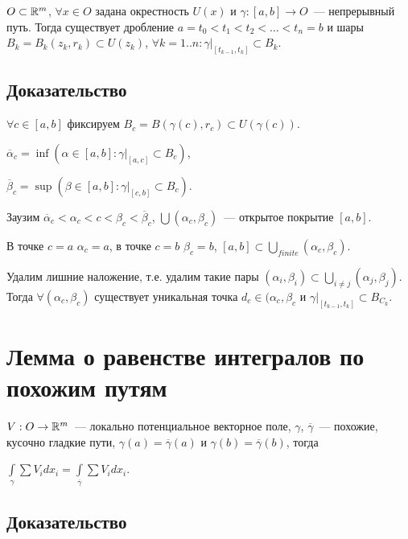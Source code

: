 \documentclass{article}
\begin{document}
        $O \subset \mathbb{R}^m$, $\forall x \in O$ задана окрестность $U(x)$ и $\gamma : [a, b] \rightarrow O$~--- непрерывный путь. Тогда существует дробление $a = t_0 < t_1 < t_2 < \ldots < t_n = b$ и шары $B_k = B_k(z_k, r_k) \subset U(z_k)$, $\forall k = 1..n : \gamma \big|_{[t_{k - 1}, t_k]} \subset B_k$.
        
        \subsection{Доказательство}
        
            $\forall c \in [a, b]$ фиксируем $B_c = B \left( \gamma(c), r_c \right) \subset U \left( \gamma (c) \right)$.
            
            $\overline{\alpha}_c = \inf \left( \alpha \in [a, b] : \gamma \bigg|_{[a, c]} \subset B_c \right)$,
            
            $\overline{\beta}_c = \sup \left( \beta \in [a, b] : \gamma \bigg|_{[c, b]} \subset B_c \right)$.
            
            Заузим $\overline{\alpha}_c < \alpha_c < c < \beta_c < \overline{\beta}_c$, $\bigcup ( \alpha_c, \beta_c )$~--- открытое покрытие $[a, b]$.
            
            В точке $c = a$ $\alpha_c = a$, в точке $c = b$ $\beta_c = b$, $[a, b] \subset \bigcup\limits_{finite} \left( \alpha_c, \beta_c \right)$. 
            
            Удалим лишние наложение, т.е. удалим такие пары $(\alpha_i, \beta_i) \subset \bigcup\limits_{i \neq j} (\alpha_j, \beta_j)$. Тогда $\forall (\alpha_c, \beta_c)$ существует уникальная точка $d_c \in (\alpha_c, \beta_c$ и $\gamma \bigg|_{[t_{k - 1}, t_k]} \subset B_{C_k}$.
            
    \newpage
    
    \section{Лемма о равенстве интегралов по похожим путям}
    
        $V : O \rightarrow \mathbb{R}^m$~--- локально потенциальное векторное поле, $\gamma$, $\overline{\gamma}$~--- похожие, кусочно гладкие пути, $\gamma(a) = \overline{\gamma}(a)$ и $\gamma(b) = \overline{\gamma}(b)$, тогда
        
        $\int\limits_{\gamma} \sum V_i dx_i = \int\limits_{\overline{\gamma}} \sum V_i dx_i$.
        
        \subsection{Доказательство}
        
\end{document}
